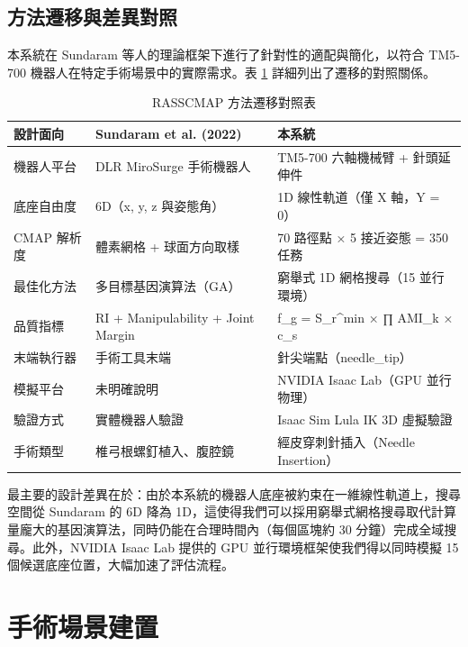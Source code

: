\documentclass[a4paper, 12pt]{article}
\begin{document}
\subsection{方法遷移與差異對照}

本系統在 Sundaram 等人的理論框架下進行了針對性的適配與簡化，以符合 TM5-700 機器人在特定手術場景中的實際需求。表 \ref{tab:migration} 詳細列出了遷移的對照關係。

\begin{table}[H]
\centering
\caption{RASSCMAP 方法遷移對照表}
\label{tab:migration}
\small
\begin{tabularx}{\textwidth}{l X X}
\toprule
\textbf{設計面向} & \textbf{Sundaram et al. (2022)} & \textbf{本系統} \\
\midrule
機器人平台 & DLR MiroSurge 手術機器人 & TM5-700 六軸機械臂 + 針頭延伸件 \\
\addlinespace
底座自由度 & 6D（x, y, z 與姿態角） & 1D 線性軌道（僅 X 軸，Y = 0） \\
\addlinespace
CMAP 解析度 & 體素網格 + 球面方向取樣 & 70 路徑點 × 5 接近姿態 = 350 任務 \\
\addlinespace
最佳化方法 & 多目標基因演算法（GA） & 窮舉式 1D 網格搜尋（15 並行環境） \\
\addlinespace
品質指標 & RI + Manipulability + Joint Margin & f\_g = S\_r\^{}min × ∏ AMI\_k × c\_s \\
\addlinespace
末端執行器 & 手術工具末端 & 針尖端點（needle\_tip） \\
\addlinespace
模擬平台 & 未明確說明 & NVIDIA Isaac Lab（GPU 並行物理） \\
\addlinespace
驗證方式 & 實體機器人驗證 & Isaac Sim Lula IK 3D 虛擬驗證 \\
\addlinespace
手術類型 & 椎弓根螺釘植入、腹腔鏡 & 經皮穿刺針插入（Needle Insertion） \\
\bottomrule
\end{tabularx}
\end{table}

最主要的設計差異在於：由於本系統的機器人底座被約束在一維線性軌道上，搜尋空間從 Sundaram 的 6D 降為 1D，這使得我們可以採用窮舉式網格搜尋取代計算量龐大的基因演算法，同時仍能在合理時間內（每個區塊約 30 分鐘）完成全域搜尋。此外，NVIDIA Isaac Lab 提供的 GPU 並行環境框架使我們得以同時模擬 15 個候選底座位置，大幅加速了評估流程。

\section{手術場景建置}
\label{sec:scene_setup}
\end{document}
